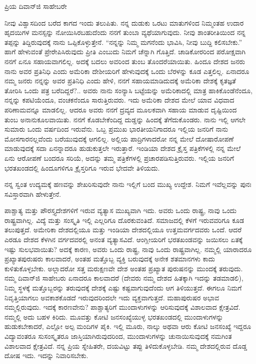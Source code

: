 \noindent
ಪ್ರಿಯ ದಿವಾನ್‌ಜಿ ಸಾಹೇಬರೇ

ನೀವು ವಿಶ್ವಾಸದಿಂದ ಬರೆದ ಕಾಗದ ಇಂದು ತಲುಪಿತು. ನನ್ನ ದುಡುಕು ಒರಟು ಮಾತುಗಳಿಂದ ನಿಮ್ಮಂತಹ ಉದಾರ ಹೃದಯಿಗಳ ಮನಸ್ಸನ್ನು ನೋಯಿಸಿರಬಹುದೆಂದು ನನಗೆ ತುಂಬಾ ವ್ಯಥೆಯಾಗುವುದು. ನೀವು ಶಾಂತರೀತಿಯಿಂದ ನನ್ನ ತಪ್ಪನ್ನು ತಿದ್ದಿರುವುದಕ್ಕೆ ನಾನು ಒಪ್ಪಿಕೊಳ್ಳುತ್ತೇನೆ. ``ನನ್ನನ್ನು ನಿಮ್ಮ ಮಗನೆಂದು ಭಾವಿಸಿ, ನೀವು ಬುದ್ದಿ ಕಲಿಸಬೇಕು.'' ಹಾಗೆ ಹೇಳುವಂತೆ ಪ್ರೇರೇಪಿಸಿರುವುದು ಪ್ರೀತಿ ಎಂಬುದು ನಿಮಗೆ ಚೆನ್ನಾಗಿ ಗೊತ್ತಿದೆ. ಚಾಡಿಕೋರರಿಂದ ಪರೋಕ್ಷವಾಗಿ ನನಗೆ ಏನೂ ಸಹಾಯವಾಗಲಿಲ್ಲ. ಅದಕ್ಕೆ ಬದಲು ಅವರಿಂದ ತುಂಬ ತೊಂದರೆಯಾಯಿತು. ಹಿಂದೂ ದೇಶದ ಜನರು ನಾನು ಅವರ ಪ್ರತಿನಿಧಿ ಎಂದು ಅಮೆರಿಕಾ ದೇಶೀಯರಿಗೆ ಹೇಳುವುದಕ್ಕೆ ಒಂದು ಬೆರಳನ್ನು ಕೂಡ ಎತ್ತಲಿಲ್ಲ. ಏನಾದರೂ ನಮ್ಮ ಜನರು ನನ್ನನ್ನು ಅವರ ಪ್ರತಿನಿಧಿ ಎಂದು ಹೇಳಿ, ನನಗೆ ಸಹಾಯಮಾಡಿದುದಕ್ಕೆ ಅಮೆರಿಕಾ ದೇಶಕ್ಕೆ ಕೃತಜ್ಞತೆ ತೋರಿಸಿ ಒಂದು ಪತ್ರ ಬರೆದಿದ್ದರೆ?.. ಅವರು ನಾನು ಸಂನ್ಯಾಸಿ ಬಟ್ಟೆಯನ್ನು ಅಮೆರಿಕಾದಲ್ಲಿ ಮಾತ್ರ ಹಾಕಿಕೊಂಡೆನೆಂದೂ, ನನ್ನನ್ನು ಕಪಟಿಯೆಂದೂ, ವಂಚಕನೆಂದೂ ಸಾರುತ್ತಿರುವರು. ಇದು ಅಮೆರಿಕಾ ದೇಶದ ಮೇಲೆ ಯಾವ ವಿಧವಾದ ಪರಿಣಾಮವನ್ನೂ ಮಾಡಲಿಲ್ಲ. ಆದರೂ ಅವರು ನನಗೆ ದ್ರವ್ಯದ ಮೂಲಕವಾಗಿ ಸಹಾಯ ಮಾಡುವ ದೃಷ್ಟಿಯಿಂದ ತುಂಬ ಅನಾನುಕೂಲವಾಯಿತು. ನನಗೆ ಕೊಡಬೇಕೆಂದಿದ್ದ ದುಡ್ಡನ್ನು ಹಿಂದಕ್ಕೆ ತೆಗೆದುಕೊಂಡರು. ನಾನು ಇಲ್ಲಿ ಆಗಲೇ ಸುಮಾರು ಒಂದು ವರ್ಷದಿಂದ ಇರುವೆನು. ಒಬ್ಬ ಪ್ರಮುಖ ಭಾರತೀಯನಿಗಾದರೂ ಇಲ್ಲಿಯ ಜನರಿಗೆ ನಾನು ಮೋಸಗಾರನಲ್ಲವೆಂದು ಬರೆಯುವುದಕ್ಕೆ ಆಗಲಿಲ್ಲ. ಅಲ್ಲಿಯ ಪಾದ್ರಿಗಳಾದರೋ ನನ್ನ ಮೇಲೆ ದೋಷಾರೋಪಣೆ ಮಾಡುವುದಕ್ಕೆ ಸದಾ ಏನನ್ನಾದರೂ ಹುಡುಕುತ್ತಲೇ ಇರುತ್ತಾರೆ. ಇಂಡಿಯಾ ದೇಶದ ಕ್ರೈಸ್ತ ಪತ್ರಿಕೆಗಳಲ್ಲಿ ನನ್ನ ಮೇಲೆ ಏನು ಆರೋಪಣೆ ಬಂದರೂ ಸರಿಯೆ, ಅದನ್ನು ತಮ್ಮ ಪತ್ರಿಕೆಗಳಲ್ಲಿ ಪ್ರಚಾರಪಡಿಸುತ್ತಿರುವರು. ಇಲ್ಲಿಯ ಜನರಿಗೆ ಭರತಖಂಡದಲ್ಲಿ ಹಿಂದೂಗಳಿಗೂ ಕ್ರೈಸ್ತರಿಗೂ ಇರುವ ಭೇದವೇ ತಿಳಿಯದು.

\vspace{0.2cm}

ನನ್ನ ಸ್ವಂತ ಉದ್ಯಮಕ್ಕೆ ಹಣವನ್ನು ಶೇಖರಿಸುವುದೇ ನಾನು ಇಲ್ಲಿಗೆ ಬಂದ ಮುಖ್ಯ ಉದ್ದೇಶ. ನಿಮಗೆ ಇವೆಲ್ಲವನ್ನು ಪುನಃ ಸವಿಸ್ತಾರವಾಗಿ ಹೇಳುತ್ತೇನೆ.

\vspace{0.2cm}

ಪಾಶ್ಚಾತ್ಯ ಮತ್ತು ಪೌರಸ್ತ್ಯದೇಶಗಳಿಗೆ ಇರುವ ವ್ಯತ್ಯಾಸ ಮುಖ್ಯವಾಗಿ ಇದು. ಅವರು ಒಂದು ರಾಷ್ಟ್ರ, ನಾವು ಒಂದು ರಾಷ್ಟ್ರವಾಗಿಲ್ಲ. ವಿದ್ಯೆ ಮತ್ತು ಸಂಸ್ಕೃತಿ ಇಲ್ಲಿ ಎಲ್ಲರಿಗೂ ದೊರಕುವಂತಿದೆ. ಸಮಾಜದಲ್ಲಿ ಕೆಳಗೆ ಇರುವವರಿಗೂ ಕೂಡ ತಲುಪುತ್ತದೆ. ಅಮೇರಿಕಾ ದೇಶದಲ್ಲಿಯೂ ಮತ್ತು ಇಂಡಿಯಾ ದೇಶದಲ್ಲಿಯೂ ಉತ್ತಮವರ್ಗದವರು ಒಂದೆ. ಆದರೆ ಎರಡೂ ದೇಶದ ಕೆಳಗಿನ ವರ್ಗದವರಲ್ಲಿ ಅನಂತ ವ್ಯತ್ಯಾಸವಿದೆ. ಆಂಗ್ಲೀಯರಿಗೆ ಭರತಖಂಡವನ್ನು ಜಯಿಸಲು ಏತಕ್ಕೆ ಇಷ್ಟು ಸುಲಭವಾಯಿತು? ಅದಕ್ಕೆ ಕಾರಣ, ಅವರು ಒಂದು ರಾಷ್ಟ್ರ, ನಾವು ಒಂದು ರಾಷ್ಟ್ರವಾಗಿಲ್ಲ. ನಮ್ಮಲ್ಲಿ ಯಾರಾದರೂ ಪ್ರಖ್ಯಾತಪುರುಷರು ಕಾಲವಾದರೆ, ಅಂತಹ ಮತ್ತೊಬ್ಬ ವ್ಯಕ್ತಿ ಬರುವುದಕ್ಕೆ ಅನೇಕ ಶತಮಾನಗಳು ಕಾದು ಕುಳಿತುಕೊಳ್ಳಬೇಕು. ಅಲ್ಲಾದರೋ ಸತ್ತ ಮರುಕ್ಷಣವೇ ದೇಶ ಅಂತಹ ಪ್ರಖ್ಯಾತ ಪುರುಷನನ್ನು ಮುಂದಕ್ಕೆ ತರುವುದು. ನಮ್ಮ ದಿವಾನ್‌ಜಿ ಸಾಹೇಬರು ಏನಾದರೂ ಕಾಲವಾದರೆ (ದೇವರು ನಮ್ಮ ದೇಶದ ಹಿತಕ್ಕಾಗಿ ಇದನ್ನು ತಡಮಾಡಲಿ), ನಿಮ್ಮ ಸ್ಥಳಕ್ಕೆ ಮತ್ತೊಬ್ಬರನ್ನು ತರುವುದಕ್ಕೆ ದೇಶಕ್ಕೆ ಎಷ್ಟು ಕಷ್ಟವಾಗುವುದೆಂದು ಆಗ ತಿಳಿಯುತ್ತದೆ. ಈಗಲೂ ನಿಮಗೆ ನಿವೃತ್ತಿಯಾಗಲು ಅವಕಾಶಕೊಡದೆ ಇರುವುದರಿಂದಲೇ ಇದು ವ್ಯಕ್ತವಾಗುತ್ತದೆ. ಮಹಾಪುರುಷರ ಅಭಾವ ನಮ್ಮಲ್ಲಿರುವುದು. ಇದಕ್ಕೆ ಕಾರಣವೇನು? ಪಾಶ್ಚಾತ್ಯರಿಗೆ ಮುಂದಾಳುಗಳನ್ನು ಆರಿಸುವುದಕ್ಕೆ ವಿಶಾಲವಾದ ಕ್ಷೇತ್ರವಿದೆ. ನಮ್ಮಲ್ಲಿ ಅದು ಬಹಳ ಕಿರಿದು. ಮೂವತ್ತು ಕೋಟಿ ಜನಸಂಖ್ಯೆಯುಳ್ಳ ಭರತಖಂಡದಲ್ಲಿ ಮುಂದಾಳುಗಳನ್ನು ಹುಡುಕಬೇಕಾದರೆ, ಎಲ್ಲೋ ಅಲ್ಪ ಮಂದಿಗಳ ಪೈಕಿ. ಇಲ್ಲಿ ಮೂರು, ನಾಲ್ಕು ಅಥವಾ ಆರು ಕೋಟಿ ಜನಸಂಖ್ಯೆ ಇದ್ದರೂ ವಿದ್ಯಾವಂತರೂ ಸುಸಂಸ್ಕೃತರೂ ಜಾಸ್ತಿಯಾಗಿರುವುದರಿಂದ, ಮುಂದಾಳುಗಳನ್ನು ಚುನಾಯಿಸುವುದಕ್ಕೆ ನಮಗಿಂತ ವಿಶಾಲವಾದ ಕ್ಷೇತ್ರವಿದೆ. ನನ್ನ ಪ್ರಿಯ ಸ್ನೇಹಿತರೇ, ದಯವಿಟ್ಟು ತಪ್ಪು ತಿಳಿದುಕೊಳ್ಳಬೇಡಿ. ನಮ್ಮ ದೇಶದಲ್ಲಿರುವ ದೊಡ್ಡ ದೋಷ ಇದು. ಇದನ್ನು ನಿವಾರಿಸಬೇಕು.

